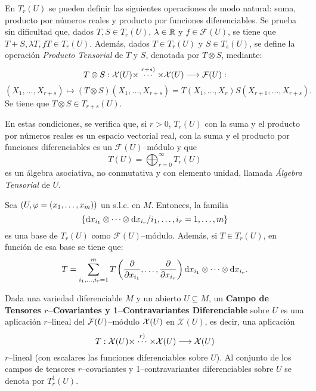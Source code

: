 \documentclass[cursovd_portada.tex]{subfiles}
\begin{document}
En $T_r(U)$ se pueden definir las siguientes operaciones de modo natural: suma, producto por n\'{u}meros reales y
producto por funciones diferenciables. Se prueba sin dificultad que, dados $T,S\in T_r(U)$, $\lambda\in\mathbb{R}$ y
$f\in\mathcal{F}(U)$, se tiene que $T+S,\lambda T,fT\in T_r(U)$. Adem\'{a}s, dados $T\in T_r(U)$ y $S\in T_s(U)$, se
define la operaci\'{o}n {\it Producto Tensorial} de $T$ y $S$, denotada por $T\otimes S$, mediante:
$$T\otimes S:{\cal X}(U)\times\stackrel{r+s)}\cdots\times\mathcal{X}(U)\longrightarrow\mathcal{F}(U):$$
$$(X_1,\dots ,X_{r+s})\mapsto(T\otimes S)(X_1,\dots ,X_{r+s})=T(X_1,\dots ,X_r)S(X_{r+1},\dots ,X_{r+s}).$$
\hs Se tiene que $T\otimes S\in T_{r+s}(U)$.
\par
En estas condiciones, se verifica que, si $r>0$, $T_r(U)$ con la suma y el producto por n\'{u}meros reales es un
espacio vectorial real, con la suma y el producto por funciones diferenciables es un $\mathcal{F}(U)$--m\'{o}dulo y
que
$$T(U)=\bigoplus_{r=0}^{\infty}T_r(U)$$
es un \'{a}lgebra asociativa, no conmutativa y con elemento unidad, llamada {\it \'{A}lgebra Tensorial} de $U$.
\begin{prop}
Sea $(U,\varphi=(x_1,\dots ,x_m))$ un s.l.c. en $M$. Entonces, la familia
$$\{{\rm d} x_{i_1}\otimes\cdots\otimes{\rm d} x_{i_r}/i_1,\dots ,i_r=1,\dots ,m\}$$
es una base de $T_r(U)$ como $\mathcal{F}(U)$--m\'{o}dulo. Adem\'{a}s, si $T\in T_r(U)$, en funci\'{o}n de esa base se tiene
que:
$$T=\sum_{i_1,\dots ,i_r=1}^mT\left(\displaystyle{\frac{\partial}{\partial x_{i_1}}},\dots
,\displaystyle{\frac{\partial}{\partial x_{i_r}}}\right){\rm d} x_{i_1}\otimes\cdots\otimes{\rm d} x_{i_r}.$$
\end{prop}
\begin{defi}
Dada una variedad diferenciable $M$ y un abierto $U\subseteq M$, un {\bf Campo de Tensores $r$--Covariantes y
1--Contravariantes Diferenciable} sobre $U$ es una aplicaci\'{o}n $r$--lineal del ${\cal F}(U)$--m\'{o}dulo ${\cal X}(U)$ en
$\mathcal{X}(U)$, es decir, una aplicaci\'{o}n
$$T:{\cal X}(U)\times\stackrel{r)}\cdots\times\mathcal{X}(U)\longrightarrow\mathcal{X}(U)$$
$r$--lineal (con escalares las funciones diferenciables sobre $U$). Al conjunto de los campos de tensores
$r$--covariantes y 1--contravariantes diferenciables sobre $U$ se denota por $T_r^1(U)$.
\end{defi}
\end{document}
